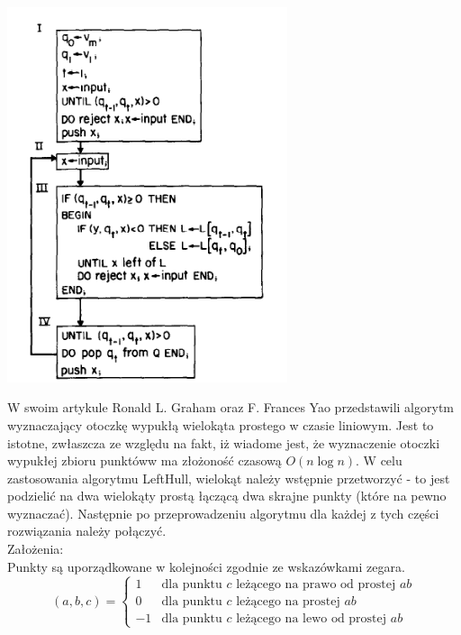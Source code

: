 \documentclass[11pt]{article}
\begin{document}
    \newpage
    \begin{center}
    \begin{Huge}
        \fontsize{46pt}{46pt}\selectfont{Algorytm wyznaczania otoczki wypukłej wielokąta prostego}
    \end{Huge}   
    \end{center}
    \begin{Large} 
        \begin{minipage}{0.4\textwidth}
            \includegraphics[decodearray={0.6 0 0.6 0 0.6 0},height=11cm]{1}
        \end{minipage}
        \begin{minipage}{0.6\textwidth}
            W swoim artykule Ronald L. Graham oraz F. Frances Yao przedstawili algorytm wyznaczający otoczkę wypukłą wielokąta prostego w czasie liniowym. Jest to istotne, zwłaszcza ze względu na fakt, iż wiadome jest, że wyznaczenie otoczki wypukłej zbioru punktóww ma złożoność czasową $O\left(n \log n\right)$. W celu zastosowania algorytmu LeftHull, wielokąt należy wstępnie przetworzyć - to jest podzielić na dwa wielokąty prostą łączącą dwa skrajne punkty (które na pewno wyznaczać). Następnie po przeprowadzeniu algorytmu dla każdej z tych części rozwiązania należy połączyć.\\
            Założenia:\\
            Punkty są uporządkowane w kolejności zgodnie ze wskazówkami zegara.\\
            $$\left(a,b,c\right) = \left\{
                \begin{array}{cl}
                    1 & \text{dla punktu $c$ leżącego na prawo od prostej $ab$}\\    
                    0 & \text{dla punktu $c$ leżącego na prostej $ab$}\\      
                    -1 & \text{dla punktu $c$ leżącego na lewo od prostej $ab$}   
                \end{array}
                
                
                \right.$$
        \end{minipage}
    \end{Large} 
\end{document}
